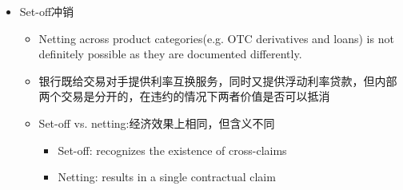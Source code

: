 \begin{itemize}
\begin{itemize}
\item Set-off冲销
\begin{itemize}
    \item Netting across product categories(e.g. OTC derivatives and loans) is not definitely possible as they are documented differently.
    \item 银行既给交易对手提供利率互换服务，同时又提供浮动利率贷款，但内部两个交易是分开的，在违约的情况下两者价值是否可以抵消

\item Set-off vs. netting:经济效果上相同，但含义不同
\begin{itemize}
    \item Set-off: recognizes the existence of cross-claims
    \item Netting: results in a single contractual claim
\end{itemize}
\end{itemize}

\end{itemize}



\end{itemize}

